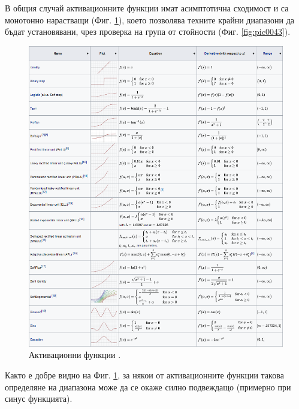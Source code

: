 \documentclass[book,14pt,oneside,openany]{memoir}
\begin{document}
В общия случай активационните функции имат асимптотична сходимост и са монотонно нарастващи (Фиг. \ref{fig:pic0044}), което позволява техните крайни диапазони да бъдат установявани, чрез проверка на група от стойности (Фиг. \ref{fig:pic0043}).

\begin{figure}[h]
  \centering
  \includegraphics[height=0.7\pdfpageheight]{pic0044}
  \caption{Активационни функции \cite{afwiki}.}
\label{fig:pic0044}
\end{figure}
\FloatBarrier

Както е добре видно на Фиг. \ref{fig:pic0044}, за някои от активационните функции такова определяне на диапазона може да се окаже силно подвеждащо (примерно при синус функцията). 
\end{document}
